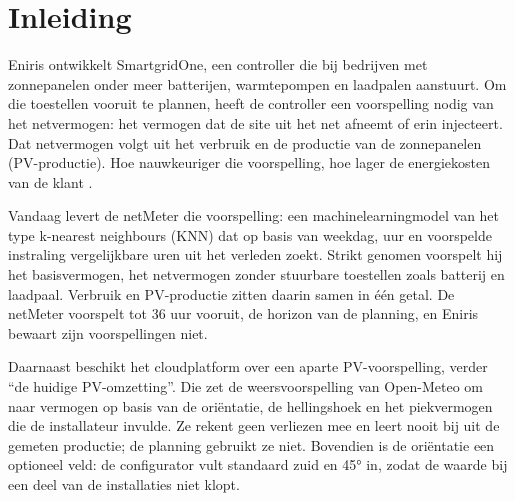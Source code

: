 


%

\section{Inleiding}%
\label{sec:inleiding}

Eniris ontwikkelt SmartgridOne, een controller die bij bedrijven met zonnepanelen onder meer batterijen, warmtepompen en laadpalen aanstuurt. Om die toestellen vooruit te plannen, heeft de controller een voorspelling nodig van het netvermogen: het vermogen dat de site uit het net afneemt of erin injecteert. Dat netvermogen volgt uit het verbruik en de productie van de zonnepanelen (PV-productie). Hoe nauwkeuriger die voorspelling, hoe lager de energiekosten van de klant \autocite{Schmitt2021}.

Vandaag levert de netMeter die voorspelling: een machinelearningmodel van het type k-nearest neighbours (KNN) dat op basis van weekdag, uur en voorspelde instraling vergelijkbare uren uit het verleden zoekt. Strikt genomen voorspelt hij het basisvermogen, het netvermogen zonder stuurbare toestellen zoals batterij en laadpaal. Verbruik en PV-productie zitten daarin samen in één getal. De netMeter voorspelt tot 36 uur vooruit, de horizon van de planning, en Eniris bewaart zijn voorspellingen niet.

Daarnaast beschikt het cloudplatform over een aparte PV-voorspelling, verder ``de huidige PV-omzetting''. Die zet de weersvoorspelling van Open-Meteo om naar vermogen op basis van de oriëntatie, de hellingshoek en het piekvermogen die de installateur invulde. Ze rekent geen verliezen mee en leert nooit bij uit de gemeten productie; de planning gebruikt ze niet. Bovendien is de oriëntatie een optioneel veld: de configurator vult standaard zuid en 45° in, zodat de waarde bij een deel van de installaties niet klopt.

